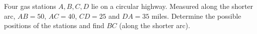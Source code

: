 Four gas stations $A,B,C,D$ lie on a circular highway. Measured along the shorter arc, $AB=50$, $AC=40$, $CD=25$ and $DA=35$ miles. Determine the possible positions of the stations and find $BC$ (along the shorter arc).
